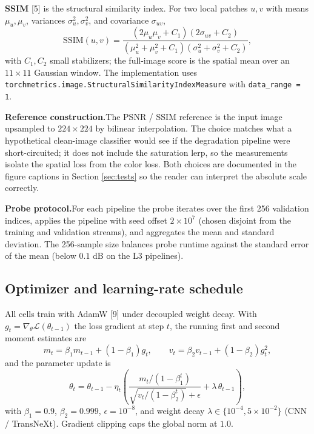 \textbf{SSIM} [5] is the structural similarity index. For
two local patches $u, v$ with means $\mu_u, \mu_v$, variances
$\sigma_u^2, \sigma_v^2$, and covariance $\sigma_{uv}$,
\begin{equation}
  \mathrm{SSIM}(u, v) = \frac{(2 \mu_u \mu_v + C_1)(2 \sigma_{uv} + C_2)}{(\mu_u^2 + \mu_v^2 + C_1)(\sigma_u^2 + \sigma_v^2 + C_2)},
  \label{eq:ssim}
\end{equation}
with $C_1, C_2$ small stabilizers; the full-image score is the spatial mean
over an $11 \times 11$ Gaussian window. The implementation uses
\texttt{torchmetrics.image.StructuralSimilarityIndexMeasure} with
\texttt{data\_range = 1}.

\textbf{Reference construction.}\quad The PSNR / SSIM reference is the
input image upsampled to $224 \times 224$ by bilinear interpolation. The
choice matches what a hypothetical clean-image classifier would see if the
degradation pipeline were short-circuited; it does not include the
saturation lerp, so the measurements isolate the spatial loss from the
color loss. Both choices are documented in the figure captions in
Section \ref{sec:tests} so the reader can interpret the absolute scale
correctly.

\textbf{Probe protocol.}\quad For each pipeline the probe iterates over
the first 256 validation indices, applies the pipeline with seed offset
$2 \times 10^7$ (chosen disjoint from the training and validation streams),
and aggregates the mean and standard deviation. The 256-sample size
balances probe runtime against the standard error of the mean (below
$0.1$ dB on the L3 pipelines).

\subsection{Optimizer and learning-rate schedule}
\label{sec:design:optim}

All cells train with AdamW [9] under decoupled
weight decay. With $g_t = \nabla_\theta \mathcal{L}(\theta_{t-1})$ the
loss gradient at step $t$, the running first and second moment estimates
are
\begin{equation}
  m_t = \beta_1 m_{t-1} + (1 - \beta_1) g_t,
  \qquad
  v_t = \beta_2 v_{t-1} + (1 - \beta_2) g_t^{2},
  \label{eq:adamw_moments}
\end{equation}
and the parameter update is
\begin{equation}
  \theta_t = \theta_{t-1} - \eta_t \!\left(
    \frac{m_t / (1 - \beta_1^{t})}{\sqrt{v_t / (1 - \beta_2^{t})} + \epsilon}
    + \lambda \, \theta_{t-1}
  \right),
  \label{eq:adamw}
\end{equation}
with $\beta_1 = 0.9$, $\beta_2 = 0.999$, $\epsilon = 10^{-8}$, and weight
decay $\lambda \in \{10^{-4}, 5 \times 10^{-2}\}$ (CNN / TransNeXt).
Gradient clipping caps the global norm at $1.0$.

